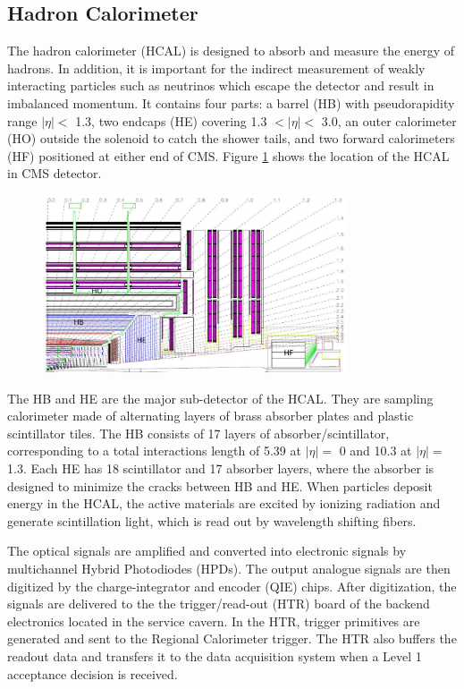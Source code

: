\documentclass[thesis.tex]{subfiles}
\begin{document}
\subsection{Hadron Calorimeter}
The hadron calorimeter (HCAL) is designed to absorb and measure the energy of hadrons. 
In addition, it is important for the indirect measurement of weakly interacting particles such as neutrinos which escape the detector and result in imbalanced momentum.
It contains four parts: a barrel (HB) with pseudorapidity range $|\eta| < $ 1.3, two endcaps (HE) covering 1.3 $ < |\eta| <$ 3.0, an outer calorimeter (HO) outside the solenoid to catch the shower tails, and two forward calorimeters (HF) positioned at either end of CMS.
Figure \ref{fig:hcal} shows the location of the HCAL in CMS detector. 

\begin{figure}[hbtp]
	\centering
	\includegraphics[width=0.8\textwidth]{plot/hcal.png}
	\label{fig:hcal}
\end{figure}

The HB and HE are the major sub-detector of the HCAL. 
They are sampling calorimeter made of alternating layers of brass absorber plates and plastic scintillator tiles.
The HB consists of 17 layers of absorber/scintillator, corresponding to a total interactions length of 5.39 at $|\eta| =$ 0 and 10.3 at $|\eta| =$ 1.3.
Each HE has 18 scintillator and 17 absorber layers, where the absorber is designed to minimize the cracks between HB and HE. 
When particles deposit energy in the HCAL, the active materials are excited by ionizing radiation and generate scintillation light, which is read out by wavelength shifting fibers. 

The optical signals are amplified and converted into electronic signals by multichannel Hybrid Photodiodes (HPDs). 
The output analogue signals are then digitized by the charge-integrator and encoder (QIE) chips. 
After digitization, the signals are delivered to the the trigger/read-out (HTR) board of the backend electronics located in the service cavern. 
In the HTR, trigger primitives are generated and sent to the Regional Calorimeter trigger.
The HTR also buffers the readout data and transfers it to the data acquisition system when a Level 1 acceptance decision is received.  
\end{document}
